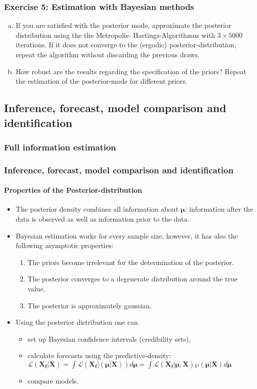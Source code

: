 \documentclass{beamer} %
\newcounter{saveenumi}
\newcommand{\seti}{\setcounter{saveenumi}{\value{enumi}}}
\newcommand{\conti}{\setcounter{enumi}{\value{saveenumi}}}
\begin{document}
\begin{frame}\frametitle{Exercise 5: Estimation with Bayesian methods}
  \begin{enumerate}[(a)]\conti
      \item If you are satisfied with the posterior mode, approximate the posterior distribution using the the Metropolis- Hastings-Algorithmus with $3\times 5000$ iterations. If it does not converge to the (ergodic) posterior-distribution, repeat the algorithm without discarding the previous draws.
  \item How robust are the results regarding the specification of the priors? Repeat the estimation of the posterior-mode for different priors.
\seti\end{enumerate}
\end{frame}


\subsection{Inference, forecast, model comparison and identification}
\begin{frame}\frametitle{Full information estimation}
  \tableofcontents[currentsection]
\end{frame}

\begin{frame}\frametitle{Inference, forecast, model comparison and identification}\framesubtitle{Properties of the Posterior-distribution}
\begin{itemize}
  \item The posterior density combines all information about $\mathbf{\mu}$: information after the data is observed as well as information prior to the data.
  \item Bayesian estimation works for every sample size, however, it has also the following asymptotic properties:
    \begin{enumerate}
      \item The priors become irrelevant for the determination of the posterior.
      \item The posterior converges to a degenerate distribution around the true value.
      \item The posterior is approximately gaussian.
    \end{enumerate}
  \item Using the posterior distribution one can
  \begin{itemize}
  \item set up Bayesian confidence intervals (credibility sets),
  \item calculate forecasts using the predictive-density: $\mathcal{L}(\mathbf{X_f}|\mathbf{X})= \int \mathcal{L}(\mathbf{X_f}|(\boldsymbol{\mu}|\mathbf{X}))d \boldsymbol{\mu} = \int \mathcal{L}(\mathbf{X_f}|\boldsymbol{\mu},\mathbf{X})\wp(\boldsymbol{\mu}|\mathbf{X})d\boldsymbol{\mu}$
  \item compare models.
\end{itemize}
\end{itemize}
\end{frame}
\end{document}
